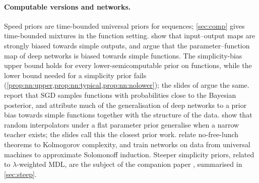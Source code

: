 \paragraph{Computable versions and networks.}\label{rem:nn:literature}
Speed priors \citep{schmidhuber2002speed,filan2016loss} are time-bounded universal priors for sequences; \cref{sec:comp} gives time-bounded mixtures in the function setting. \citet{dingle2018input} show that input--output maps are strongly biased towards simple outputs, and \citet{valle2019deep} argue that the parameter--function map of deep networks is biased towards simple functions. The simplicity-bias upper bound holds for every lower-semicomputable prior on functions, while the lower bound needed for a simplicity prior fails (\cref{prop:nn:upper,prop:nn:typical,prop:nn:nolower}); the slides of \citet{vaintrobhanni2026nnbayes} argue the same. \citet{mingard2021sgd} report that SGD samples functions with probabilities close to the Bayesian posterior, and \citet{mingard2025deep} attribute much of the generalisation of deep networks to a prior bias towards simple functions together with the structure of the data. \citet{buzaglo2024} show that random interpolators under a flat parameter prior generalise when a narrow teacher exists; the slides call this the closest prior work. \citet{goldblum2023no} relate no-free-lunch theorems to Kolmogorov complexity, and \citet{grau2024learning} train networks on data from universal machines to approximate Solomonoff induction. Steeper simplicity priors, related to $\lambda$-weighted MDL, are the subject of the companion paper \citep{claudeSFI2026steeper}, summarised in \cref{sec:steep}.

